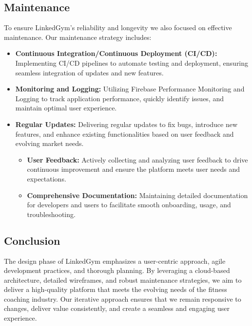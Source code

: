 \subsection{Maintenance}
To ensure LinkedGym's reliability and longevity we also focused on effective maintenance. Our maintenance strategy includes:

\begin{itemize}
  \item \textbf{Continuous Integration/Continuous Deployment (CI/CD):} Implementing CI/CD pipelines to automate testing and deployment, ensuring seamless integration of updates and new features.
  
  \item \textbf{Monitoring and Logging:} Utilizing Firebase Performance Monitoring and Logging to track application performance, quickly identify issues, and maintain optimal user experience.
  
  \item \textbf{Regular Updates:} Delivering regular updates to fix bugs, introduce new features, and enhance existing functionalities based on user feedback and evolving market needs.

\begin{itemize}
\item \textbf{User Feedback:} Actively collecting and analyzing user feedback to drive continuous improvement and ensure the platform meets user needs and expectations.

\item \textbf{Comprehensive Documentation:} Maintaining detailed documentation for developers and users to facilitate smooth onboarding, usage, and troubleshooting.
\end{itemize}
\end{itemize}


\subsection{Conclusion}
The design phase of LinkedGym emphasizes a user-centric approach, agile development practices, and thorough planning. By leveraging a cloud-based architecture, detailed wireframes, and robust maintenance strategies, we aim to deliver a high-quality platform that meets the evolving needs of the fitness coaching industry. Our iterative approach ensures that we remain responsive to changes, deliver value consistently, and create a seamless and engaging user experience.
